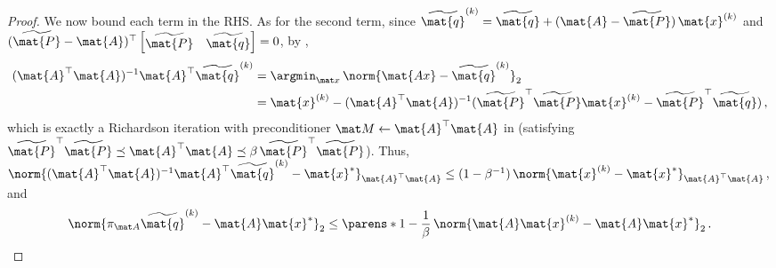 \begin{proof}
We now bound each term in the RHS. As for the second term, since $\widetilde{\mat{q}}^{(k)} = \widetilde{\mat{q}} + (\mat{A} - \widetilde{\mat{P}})\, \mat{x}^{(k)}$ and $(\widetilde{\mat{P}}-\mat{A})^\top \begin{bmatrix}
\widetilde{\mat{P}} & \widetilde{\mat{q}} \end{bmatrix} = 0$, by ,
\begin{align*}
    (\mat{A}^\top \mat{A})^{-1} \mat{A}^\top\widetilde{\mat{q}}^{(k)}
    &=
    \argmin_{\mat x}\,\norm{\mat{Ax}-\widetilde{\mat{q}}^{(k)}}_2 \\
    &=
    \mat{x}^{(k)} - (\mat{A}^\top \mat{A})^{-1} (\widetilde{\mat{P}}^\top\widetilde{\mat{P}}\mat{x}^{(k)} - \widetilde{\mat{P}}^\top\widetilde{\mat{q}})\,,
\end{align*}
which is exactly a Richardson iteration with preconditioner $\mat M\gets \mat{A}^\top \mat{A}$ in  (satisfying $\widetilde{\mat{P}}^\top \widetilde{\mat{P}} \preceq \mat{A}^\top \mat{A}\preceq \beta\,\widetilde{\mat{P}}^\top \widetilde{\mat{P}}$). 
Thus, $\norm{(\mat{A}^\top \mat{A})^{-1} \mat{A}^\top\widetilde{\mat{q}}^{(k)} - \mat{x}^*}_{\mat{A}^\top \mat{A}} \leq (1-\beta^{-1})\,\norm{\mat{x}^{(k)} - \mat{x}^*}_{\mat{A}^\top \mat{A}}$, and
\begin{equation}
    \label{eq:second-term-bound-on-a-norm}
    \norm{\pi_{\mat A}\widetilde{\mat{q}}^{(k)} - \mat{A} \mat{x}^*}_2
    \leq
    \parens*{1-\frac 1 \beta}\, \norm{\mat{A} \mat{x}^{(k)} - \mat{A}\mat{x}^*}_2\,.
\end{equation}


\end{proof}
